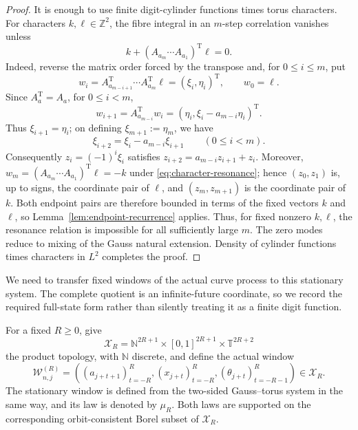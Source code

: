\documentclass[11pt,a4paper]{amsart}
\theoremstyle{definition}
\theoremstyle{remark}
\newcommand{\T}{\mathbb T}
\newcommand{\N}{\mathbb N}
\newcommand{\Z}{\mathbb Z}
\begin{document}
\begin{proof}
It is enough to use finite digit-cylinder functions times torus characters.
For characters $k,\ell\in\Z^2$, the fibre integral in an $m$-step
correlation vanishes unless
\begin{equation}\label{eq:character-resonance}
 k+(A_{a_m}\cdots A_{a_1})^{\mathrm T}\ell=0.
\end{equation}
Indeed, reverse the matrix order forced by the transpose and, for
$0\le i\le m$, put
\[
 w_i=A_{a_{m-i+1}}^{\mathrm T}\cdots A_{a_m}^{\mathrm T}\ell
     =(\xi_i,\eta_i)^{\mathrm T},
 \qquad w_0=\ell.
\]
Since $A_a^{\mathrm T}=A_a$, for $0\le i<m$,
\[
 w_{i+1}=A_{a_{m-i}}^{\mathrm T}w_i
          =(\eta_i,\xi_i-a_{m-i}\eta_i)^{\mathrm T}.
\]
Thus $\xi_{i+1}=\eta_i$; on defining $\xi_{m+1}:=\eta_m$, we have
\[
 \xi_{i+2}=\xi_i-a_{m-i}\xi_{i+1}
 \qquad(0\le i<m).
\]
Consequently $z_i=(-1)^i\xi_i$ satisfies
$z_{i+2}=a_{m-i}z_{i+1}+z_i$.  Moreover,
$w_m=(A_{a_m}\cdots A_{a_1})^{\mathrm T}\ell=-k$ under
\eqref{eq:character-resonance}; hence $(z_0,z_1)$ is, up to signs, the
coordinate pair of $\ell$, and $(z_m,z_{m+1})$ is the coordinate pair of
$k$.  Both endpoint pairs are therefore bounded in terms of the fixed
vectors $k$ and $\ell$, so
Lemma~\ref{lem:endpoint-recurrence} applies.  Thus, for fixed nonzero
$k,\ell$, the resonance relation is
impossible for all sufficiently large $m$.  The zero modes reduce to mixing
of the Gauss natural extension.
Density of cylinder functions times characters in $L^2$ completes the proof.
\end{proof}

We need to transfer fixed windows of the actual curve process to this
stationary system.  The complete quotient is an infinite-future coordinate,
so we record the required full-state form rather than silently treating it as
a finite digit function.

For a fixed $R\ge0$, give
\begin{equation}\label{eq:window-space}
 \mathcal X_R
 =\N^{2R+1}\times[0,1]^{2R+1}\times\T^{2R+2}
\end{equation}
the product topology, with $\N$ discrete, and define the actual window
\begin{equation}\label{eq:actual-window}
 \mathcal W_{n,j}^{(R)}=
 \left((a_{j+t+1})_{t=-R}^{R},
       (x_{j+t})_{t=-R}^{R},
       (\theta_{j+t})_{t=-R-1}^{R}\right)\in\mathcal X_R.
\end{equation}
The stationary window is defined from the two-sided Gauss--torus system in
the same way, and its law is denoted by $\mu_R$.  Both laws are supported on
the corresponding orbit-consistent Borel subset of $\mathcal X_R$.
\end{document}
